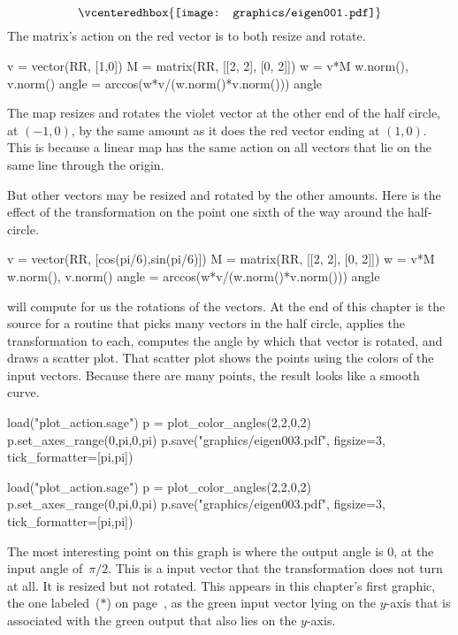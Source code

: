 \begin{equation*}
  \vcenteredhbox{\texttt{[image: graphics/eigen001.pdf]}}
\end{equation*}
The matrix's action on the red vector is to both resize and rotate.
\begin{sageoutput}
v = vector(RR, [1,0])
M = matrix(RR, [[2, 2], [0, 2]])
w = v*M
w.norm(), v.norm() 
angle = arccos(w*v/(w.norm()*v.norm())) 
angle 
\end{sageoutput}
\noindent The map resizes and rotates the violet vector at the other end of the 
half circle, at $(-1,0)$, by the
same amount as it does the red vector ending at $(1,0)$. 
This is because a linear map has the same action on 
all vectors that lie on the same line through the origin.

But other vectors may be resized and rotated by the other
amounts.
Here is the effect of the transformation on the point
one sixth of the way around the half-circle.
\begin{sageoutput}
v = vector(RR, [cos(pi/6),sin(pi/6)])
M = matrix(RR, [[2, 2], [0, 2]])
w = v*M
w.norm(), v.norm() 
angle = arccos(w*v/(w.norm()*v.norm())) 
angle 
\end{sageoutput}

\Sage{} will compute for us the rotations of the vectors.
At the end of this chapter is the source for a routine 
 that
picks many vectors in the 
half circle, applies the transformation to each, 
computes the angle by which that
vector is rotated, and draws a scatter plot. 
That scatter plot shows the points using
the colors of the input vectors.
Because there are many points, the result looks like a smooth curve.
\begin{sageoutput}[d,0,1]
load("plot_action.sage")  
p = plot_color_angles(2,2,0,2)
p.set_axes_range(0,pi,0,pi)
p.save("graphics/eigen003.pdf", figsize=3, tick_formatter=[pi,pi])
\end{sageoutput}
\begin{sagesilent}
load("plot_action.sage")  
p = plot_color_angles(2,2,0,2)
p.set_axes_range(0,pi,0,pi)
p.save("graphics/eigen003.pdf", figsize=3, tick_formatter=[pi,pi])
\end{sagesilent}
\begin{center}
\end{center}
The most interesting point on this graph is where the output angle is $0$,
at the input angle of~$\pi/2$.
This is a input vector that the transformation does not turn at all. 
It is resized but not rotated.
This appears in this chapter's first graphic, the one labeled~($*$)
on page~\pageref{gr:firstgraphic}, 
as the green input vector lying on the $y$-axis
that is associated with the green output that also lies on the $y$-axis.




